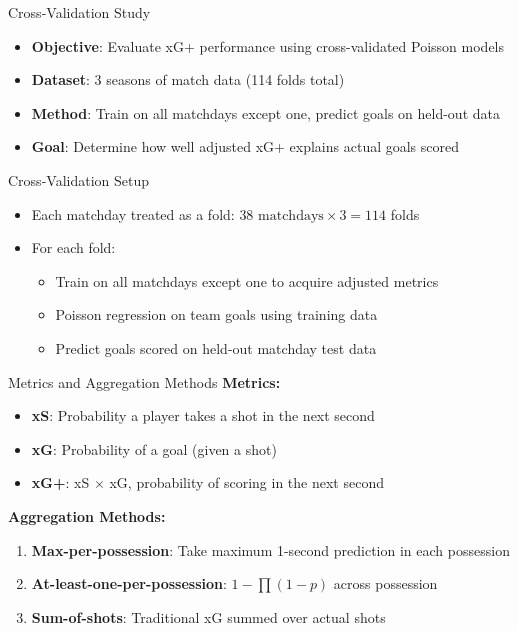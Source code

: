 \documentclass{beamer}
\begin{document}
\begin{frame}{Cross-Validation Study}
\begin{itemize}
\item \textbf{Objective}: Evaluate xG+ performance using cross-validated Poisson models
\item \textbf{Dataset}: 3 seasons of match data (114 folds total)
\item \textbf{Method}: Train on all matchdays except one, predict goals on held-out data
\item \textbf{Goal}: Determine how well adjusted xG+ explains actual goals scored
\end{itemize}
\end{frame}

\begin{frame}{Cross-Validation Setup}
\begin{itemize}
\item Each matchday treated as a fold: $38 \text{ matchdays} \times 3 = 114$ folds
\item For each fold:
  \begin{itemize}
  \item Train on all matchdays except one to acquire adjusted metrics
  \item Poisson regression on team goals using training data
  \item Predict goals scored on held-out matchday test data
  \end{itemize}
\end{itemize}
\end{frame}

\begin{frame}{Metrics and Aggregation Methods}
\textbf{Metrics:}
\begin{itemize}
\item \textbf{xS}: Probability a player takes a shot in the next second
\item \textbf{xG}: Probability of a goal (given a shot)
\item \textbf{xG+}: xS $\times$ xG, probability of scoring in the next second
\end{itemize}

\textbf{Aggregation Methods:}
\begin{enumerate}
\item \textbf{Max-per-possession}: Take maximum 1-second prediction in each possession
\item \textbf{At-least-one-per-possession}: $1 - \prod (1 - p)$ across possession
\item \textbf{Sum-of-shots}: Traditional xG summed over actual shots
\end{enumerate}
\end{frame}
\end{document}
